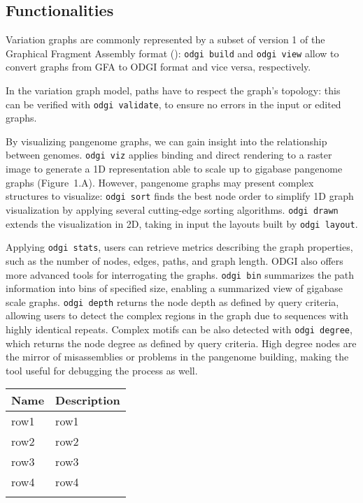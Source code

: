 \documentclass{bioinfo}
\begin{document}
    \subsection{Functionalities}

    Variation graphs are commonly represented by a subset of version 1 of the Graphical Fragment Assembly format
    (\citep{GFAv1}): \texttt{odgi build} and \texttt{odgi view} allow to convert graphs from GFA to ODGI format and
    vice versa, respectively.

    In the variation graph model, paths have to respect the graph's topology: this can be verified with
    \texttt{odgi validate}, to ensure no errors in the input or edited graphs.

    By visualizing pangenome graphs, we can gain insight into the relationship between genomes. \texttt{odgi viz}
    applies binding and direct rendering to a raster image to generate a 1D representation able to scale up to gigabase
    pangenome graphs (Figure~1.A\vphantom{\ref{fig:01}}). However, pangenome graphs may present complex structures to
    visualize: \texttt{odgi sort} finds the best node order to simplify 1D graph visualization by applying several
    cutting-edge sorting algorithms. \texttt{odgi drawn} extends the visualization in 2D, taking in input the layouts
    built by \texttt{odgi layout}.

    Applying \texttt{odgi stats}, users can retrieve metrics describing the graph properties, such as the number of
    nodes, edges, paths, and graph length. ODGI also offers more advanced tools for interrogating the graphs.
    \texttt{odgi bin} summarizes the path information into bins of specified size, enabling a summarized view of
    gigabase scale graphs. \texttt{odgi depth} returns the node depth as defined by query criteria, allowing users to
    detect the complex regions in the graph due to sequences with highly identical repeats. Complex motifs can be also
    detected with \texttt{odgi degree}, which returns the node degree as defined by query criteria. High degree nodes
    are the mirror of misassemblies or problems in the pangenome building, making the tool useful for debugging the
    process as well.

    \begin{table}[!t]
         {
            \begin{tabular}{@{}ll@{}}
                \toprule Name & Description \\
                \midrule
                row1          & row1        \\
                row2          & row2        \\
                row3          & row3        \\
                row4          & row4        \\
                \botrule
            \end{tabular}}

    \end{table}
\end{document}
